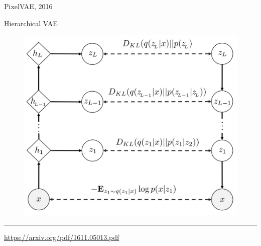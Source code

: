 \begin{frame}{PixelVAE, 2016}
	\begin{block}{Hierarchical VAE}
		\begin{figure}
			\centering
			\includegraphics[width=0.7\linewidth]{figs/PixelVAE_1.png}
		\end{figure}
	\end{block}
	\vfill
	\hrule\medskip
	{\scriptsize \href{https://arxiv.org/pdf/1611.05013.pdf}{https://arxiv.org/pdf/1611.05013.pdf}}
\end{frame}
